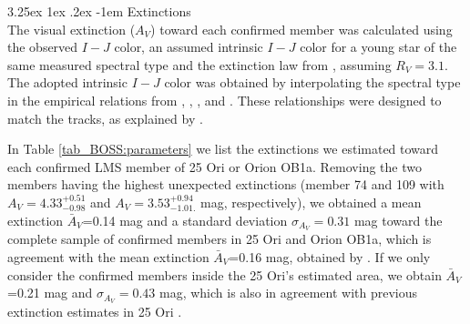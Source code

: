 \documentclass[12pt]{article}
\makeatletter
\renewcommand\paragraph{\@startsection{paragraph}{5}{\z@}%
  {3.25ex \@plus1ex \@minus.2ex}%
  {-1em}%
  {\normalfont\normalsize\bfseries}}
\makeatother
\begin{document}
\paragraph{Extinctions\\}
\label{sec_BOSS:extinction}
The visual extinction ($A_V$) toward each confirmed member was calculated using the observed $I-J$ color, an assumed intrinsic $I-J$ color for a young star of the same measured spectral type and the extinction law from \citet{Fitzpatrick1999}, assuming $R_V=3.1$. The adopted intrinsic $I-J$ color was obtained by interpolating the spectral type in the empirical relations from \citet{Kenyon-Hartmann1995}, \citet{Luhman1999}, \citet{Briceno2002}, and \citet{Luhman2003a}. These relationships were designed to match the \citet{Baraffe1998} tracks, as explained by \citet{Luhman2003b}.

In Table \ref{tab_BOSS:parameters} we list the extinctions we estimated toward each confirmed LMS member of 25 Ori or Orion OB1a. Removing the two members having the highest unexpected extinctions (member 74 and 109 with $A_V=4.33^{+0.51}_{-0.98}$ and $A_V=3.53^{+0.94}_{-1.01.}$ mag, respectively), we obtained a mean extinction $\bar{A}_V$=0.14 mag and a standard deviation $\sigma _{A_V}=0.31$ mag toward the complete sample of confirmed members in 25 Ori and Orion OB1a, which is agreement with the mean extinction $\bar{A}_V$=0.16 mag, obtained by \citet{Downes2015}. If we only consider the confirmed members inside the 25 Ori's estimated area, we obtain $\bar{A}_V$=0.21 mag and $\sigma _{A_V}=0.43$ mag, which is also in agreement with previous extinction estimates in 25 Ori \citep[0.27 mag, 0.28 mag, 0.29 mag, and 0.30 mag by ][respectively]{Kharchenko2005, Briceno2005, Briceno2007, Downes2014}.
\end{document}
